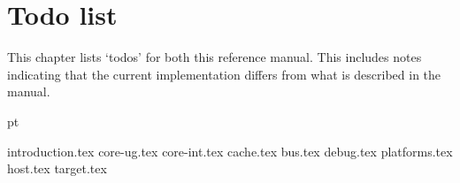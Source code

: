 \documentclass[11pt,twoside]{ce}
\newcommand{\rvex}{\texorpdfstring{$\rho$}{r}-VEX}
\begin{document}



\setcounter{page}{1}


\tableofcontents



\chapter*{Todo list}

This chapter lists `todos' for both this reference manual. This includes notes
indicating that the current implementation differs from what is described in the
manual.

 pt

\makeatletter
{}
\makeatother



{introduction.tex}
{core-ug.tex}
{core-int.tex}
{cache.tex}
{bus.tex}
{debug.tex}
{platforms.tex}
{host.tex}
{target.tex}






\end{document}
